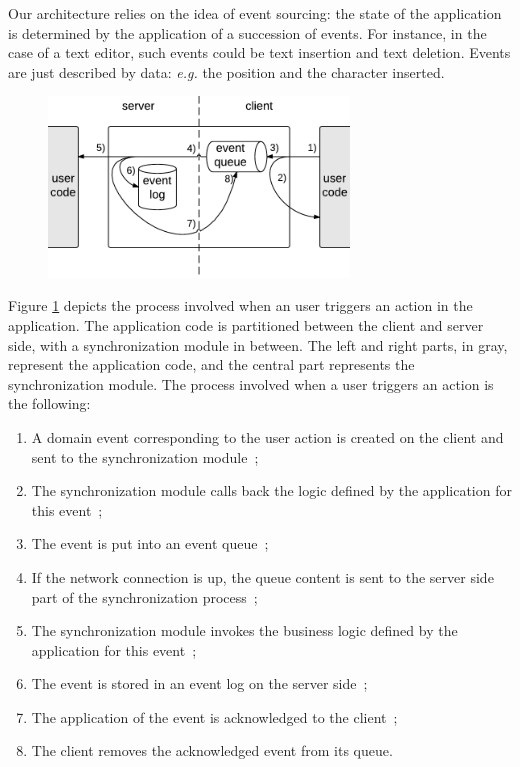 \documentclass{article}
\begin{document}
Our architecture relies on the idea of event sourcing: the state of the application is determined by the application of a succession of events. For instance, in the case of a text editor, such events could be text insertion and text deletion. Events are just described by data: \emph{e.g.} the position and the character inserted.

\begin{figure}
\centering
\includegraphics[width=8cm]{arch.pdf}
\label{fig-arch}
\end{figure}

Figure \ref{fig-arch} depicts the process involved when an user triggers an action in the application. The application code is partitioned between the client and server side, with a synchronization module in between. The left and right parts, in gray, represent the application code, and the central part represents the synchronization module. The process involved when a user triggers an action is the following:

\begin{enumerate}
 \item A domain event corresponding to the user action is created on the client and sent to the synchronization module~;
 \item The synchronization module calls back the logic defined by the application for this event~;
 \item The event is put into an event queue~;
 \item If the network connection is up, the queue content is sent to the server side part of the synchronization process~;
 \item The synchronization module invokes the business logic defined by the application for this event~;
 \item The event is stored in an event log on the server side~;
 \item The application of the event is acknowledged to the client~;
 \item The client removes the acknowledged event from its queue.
\end{enumerate}
\end{document}
